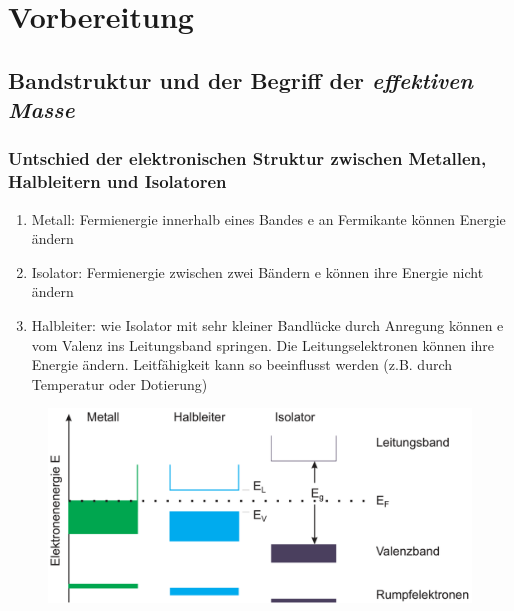 \section{Vorbereitung}

\subsection{Bandstruktur und der Begriff der \textit{effektiven Masse}}

\subsubsection*{Untschied der elektronischen Struktur zwischen Metallen, Halbleitern und Isolatoren}
\begin{enumerate}
\item Metall:     
    Fermienergie innerhalb eines Bandes \to e an Fermikante können Energie ändern
\item Isolator:   
    Fermienergie zwischen zwei Bändern  \to e können ihre Energie nicht ändern
\item Halbleiter: 
    wie Isolator mit sehr kleiner Bandlücke \to durch Anregung können e vom Valenz ins Leitungsband springen.
    Die Leitungselektronen können ihre Energie ändern.
    Leitfähigkeit kann so beeinflusst werden (z.B. durch Temperatur oder Dotierung)
\end{enumerate}
\begin{figure}[H]
    \centering
    \includegraphics[scale=0.4]{pictures/Bandstrukturen.png}
\end{figure}


